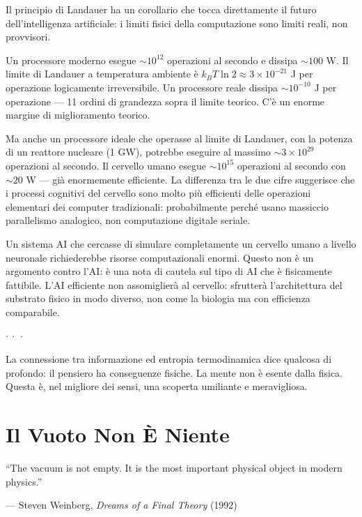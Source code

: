 \documentclass[12pt,a4paper,openany]{book}
\newcommand{\sezione}[1]{\vspace{1.2em}{\large\bfseries #1}\vspace{0.5em}\par}
\newcommand{\puntini}{\begin{center}$\cdot\ \cdot\ \cdot$\end{center}\vspace{0.3em}}
\begin{document}
Il principio di Landauer ha un corollario che tocca direttamente il futuro dell'intelligenza artificiale: i limiti fisici della computazione sono limiti reali, non provvisori.

Un processore moderno esegue $\sim 10^{12}$ operazioni al secondo e dissipa $\sim 100$ W. Il limite di Landauer a temperatura ambiente è $k_B T \ln 2 \approx 3 \times 10^{-21}$ J per operazione logicamente irreversibile. Un processore reale dissipa $\sim 10^{-10}$ J per operazione --- 11 ordini di grandezza sopra il limite teorico. C'è un enorme margine di miglioramento teorico.

Ma anche un processore ideale che operasse al limite di Landauer, con la potenza di un reattore nucleare (1 GW), potrebbe eseguire al massimo $\sim 3 \times 10^{29}$ operazioni al secondo. Il cervello umano esegue $\sim 10^{15}$ operazioni al secondo con $\sim 20$ W --- già enormemente efficiente. La differenza tra le due cifre suggerisce che i processi cognitivi del cervello sono molto più efficienti delle operazioni elementari dei computer tradizionali: probabilmente perché usano massiccio parallelismo analogico, non computazione digitale seriale.

Un sistema AI che cercasse di simulare completamente un cervello umano a livello neuronale richiederebbe risorse computazionali enormi. Questo non è un argomento contro l'AI: è una nota di cautela sul tipo di AI che è fisicamente fattibile. L'AI efficiente non assomiglierà al cervello: sfrutterà l'architettura del substrato fisico in modo diverso, non come la biologia ma con efficienza comparabile.

\puntini

La connessione tra informazione ed entropia termodinamica dice qualcosa di profondo: il pensiero ha conseguenze fisiche. La mente non è esente dalla fisica. Questa è, nel migliore dei sensi, una scoperta umiliante e meravigliosa.

\chapter{Il Vuoto Non È Niente}

\epigraph{``The vacuum is not empty. It is the most important physical object in modern physics.''}{--- Steven Weinberg, \textit{Dreams of a Final Theory} (1992)}

\sezione{Il vuoto quantistico}
\end{document}
